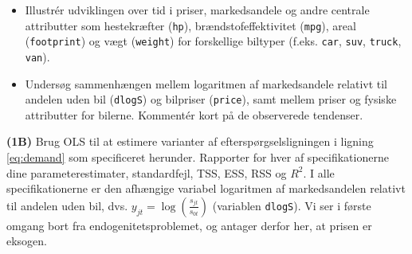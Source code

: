 \documentclass[a4paper,12pt]{article}
\begin{document}
\begin{itemize}
    \item Illustrér udviklingen over tid i priser, markedsandele og andre centrale attributter som hestekræfter (\texttt{hp}), brændstofeffektivitet (\texttt{mpg}), areal (\texttt{footprint}) og vægt (\texttt{weight}) for forskellige biltyper (f.eks. \texttt{car}, \texttt{suv}, \texttt{truck}, \texttt{van}).
    \item Undersøg sammenhængen mellem logaritmen af markedsandele relativt til andelen uden bil (\texttt{dlogS}) og bilpriser (\texttt{price}), samt mellem priser og fysiske attributter for bilerne. Kommentér kort på de observerede tendenser.
\end{itemize} 
\hrulefill
\bigskip

\noindent \textbf{(1B)} Brug OLS til at estimere varianter af efterspørgselsligningen i ligning \eqref{eq:demand} som specificeret herunder. Rapporter for hver af specifikationerne dine parameterestimater, standardfejl, TSS, ESS, RSS og $R^2$.
I alle specifikationerne er den afhængige variabel logaritmen af markedsandelen relativt til andelen uden bil, dvs. $y_{jt}= \log\left(\frac{s_{jt}}{s_{0t}}\right)$ (variablen \texttt{dlogS}). Vi ser i første omgang bort fra endogenitetsproblemet, og antager derfor her, at prisen er eksogen.
\end{document}
